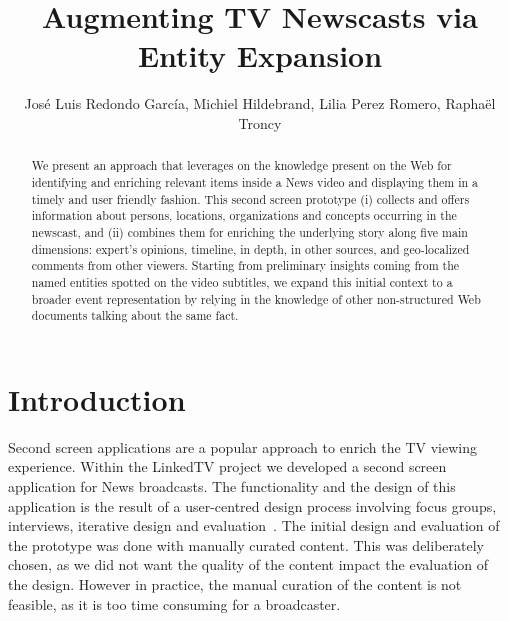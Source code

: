 \documentclass{llncs}
\begin{document}
\frontmatter          %
\pagestyle{headings}  %
\mainmatter              %

\title{Augmenting TV Newscasts via Entity Expansion}
\author{Jos\'e Luis Redondo Garc\'ia, Michiel Hildebrand, Lilia Perez Romero, Rapha\"el Troncy}


\maketitle              %


\begin{abstract}
We present an approach that leverages on the knowledge present on the Web for identifying and enriching relevant items inside a News video and displaying them in a timely and user friendly fashion. 
This second screen prototype (i) collects and offers information about persons, locations, organizations and concepts occurring in the newscast, and (ii) combines them for enriching the underlying story along five main dimensions: expert's opinions, timeline, in depth, in other sources, and geo-localized comments from other viewers.  
Starting from preliminary insights coming from the named entities spotted on the video subtitles, we expand this initial context to a broader event representation by relying in the knowledge of other non-structured Web documents talking about the same fact. 


\end{abstract}


\section{Introduction}
Second screen applications are a popular approach to enrich the TV viewing experience. Within the LinkedTV project we developed a second screen application for News broadcasts. The functionality and the design of this application is the result of a user-centred design process involving focus groups, interviews, iterative design and evaluation~\cite{lilia2013}. The initial design and evaluation of the prototype was done with manually curated content. This was deliberately chosen, as we did not want the quality of the content impact the evaluation of the design. However in practice, the manual curation of the content is not feasible, as it is too time consuming for a broadcaster.
\end{document}
